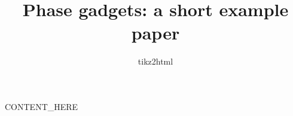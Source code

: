 \documentclass[11pt]{article}
\title{Phase gadgets: a short example paper}
\author{tikz2html}
\begin{document}
CONTENT_HERE
\end{document}
